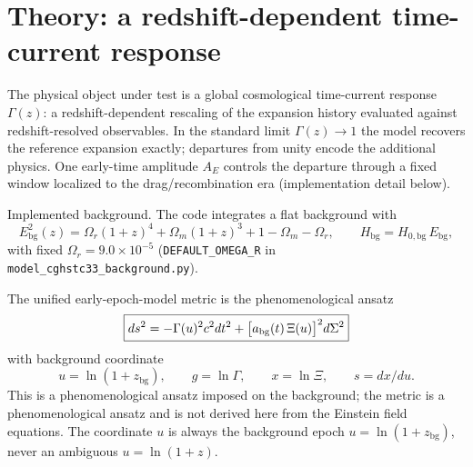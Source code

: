 \section{Theory: a redshift-dependent time-current response}
\label{sec:theory}

The physical object under test is a global cosmological
time-current response $\Gamma(z)$: a redshift-dependent rescaling
of the expansion history evaluated against redshift-resolved
observables. In the standard limit $\Gamma(z) \to 1$ the model
recovers the reference expansion exactly; departures from unity
encode the additional physics. One early-time amplitude $A_{E}$
controls the departure through a fixed window localized to the
drag/recombination era (implementation detail below).

Implemented background. The code integrates a flat background with
\begin{equation}
  E_{\mathrm{bg}}^{2}(z)
    = \Omega_{r}(1+z)^{4} + \Omega_{m}(1+z)^{3}
      + 1 - \Omega_{m} - \Omega_{r},
  \qquad
  H_{\mathrm{bg}} = H_{0,\mathrm{bg}}\,E_{\mathrm{bg}},
  \label{eq:ebg}
\end{equation}
with fixed $\Omega_{r}=9.0\times10^{-5}$
(\texttt{DEFAULT\_OMEGA\_R} in
\texttt{model\_cghstc33\_background.py}).

The unified early-epoch-model metric is the phenomenological ansatz
\begin{equation}
  \boxed{%
    ds^{2} = -\Gamma(u)^{2} c^{2} dt^{2}
    + \bigl[a_{\mathrm{bg}}(t)\,\Xi(u)\bigr]^{2} d\Sigma^{2}%
  }
  \label{eq:late-metric}
\end{equation}
with background coordinate
\begin{equation}
  u = \ln(1+z_{\mathrm{bg}}),
  \qquad
  g = \ln\Gamma,
  \qquad
  x = \ln\Xi,
  \qquad
  s = dx/du.
  \label{eq:coords}
\end{equation}
This is a phenomenological ansatz imposed on the background; the metric
is a phenomenological ansatz and is not derived here from the Einstein
field equations. The coordinate $u$ is always
the background epoch $u=\ln(1+z_{\mathrm{bg}})$, never an ambiguous
$u=\ln(1+z)$.

